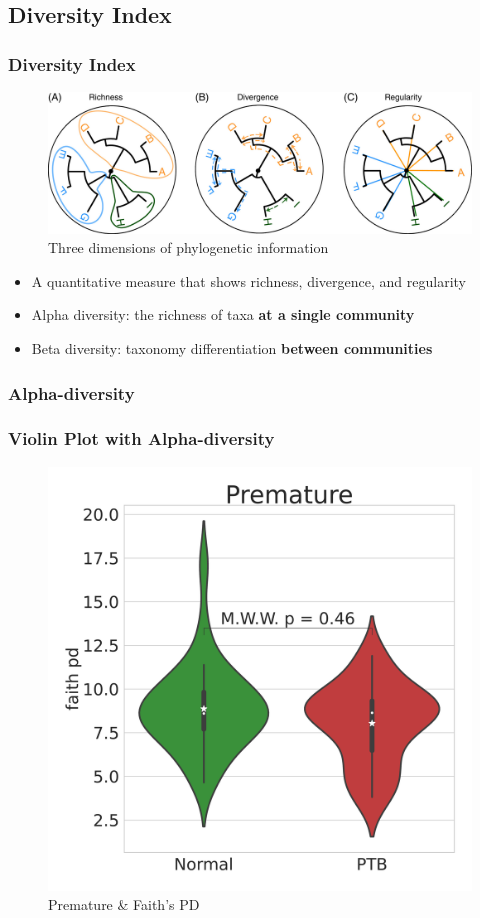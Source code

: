 \documentclass{beamer}
\begin{document}
    \subsection{Diversity Index}
    \begin{frame}
        \frametitle{Diversity Index}

        \begin{figure}
            \includegraphics[width=0.6 \linewidth]{figures/phylogenic.jpg}
            \caption{Three dimensions of phylogenetic information \protect\cite{phylogenetic1}}
        \end{figure}

        \begin{itemize}
            \item A quantitative measure that shows richness, divergence, and regularity \cite{phylogenetic1}
            \item Alpha diversity: the richness of taxa \textbf{at a single community}
            \item Beta diversity: taxonomy differentiation \textbf{between communities}
        \end{itemize}
    \end{frame}

    \subsubsection{Alpha-diversity}
    \begin{frame}
        \frametitle{Violin Plot with Alpha-diversity}

        \begin{figure}
            \includegraphics[width=0.5 \linewidth]{figures/AlphaDiversity/singleton.DADA2/Mouth+Premature+faith_pd.pdf}
            \caption{Premature \& Faith's PD}
        \end{figure}
    \end{frame}
\end{document}
